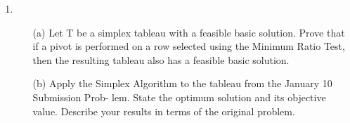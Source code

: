 \documentclass{article}[12pt,a4paper]
\begin{document}
\begin{enumerate}
  \item 
  
  \begin{enumerate}
  \item[(a)] Let T be a simplex tableau with a feasible basic solution. Prove that if a pivot
  is performed on a row selected using the Minimum Ratio Test, then the resulting
  tableau also has a feasible basic solution.
  \item[(b)] Apply the Simplex Algorithm to the tableau from the January 10 Submission Prob-
  lem. State the optimum solution and its objective value. Describe your results in
  terms of the original problem.
  \end{enumerate}
  
  \end{enumerate}
  \pagebreak
  
\end{document}
